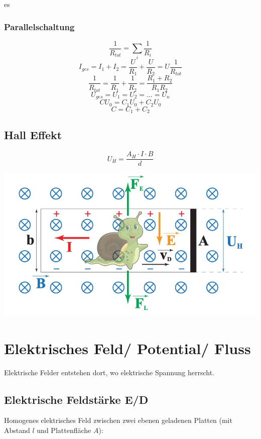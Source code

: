 es\documentclass[a4paper, fontsize=8pt, landscape]{scrartcl}
\begin{document}
\begin{multicols*}{4}
\subsubsection{Parallelschaltung}
\[\frac{1}{R_{tot}} = \sum_i \frac{1}{R_i}\]
\[I_{ges} = I_1 + I_2 = \frac{U}{R_1} + \frac{U}{R_2} = U\frac{1}{R_{tot}}\]
\[\frac{1}{R_{tot}} = \frac{1}{R_1} + \frac{1}{R_2} = \frac{R_1 + R_2}{R_1R_2}\]
\[U_{ges} = U_1 = U_2 = \dots = U_n\]
\[CU_0 = C_1U_0 + C_2U_0\]
\[C = C_1 + C_2\]


\subsection{Hall Effekt}
\[U_H = \frac{A_H \cdot I \cdot B}{d}\]
\begin{center}
    \includegraphics[scale=0.15]{Images/Halleffekt.jpg}
\end{center}

\columnbreak
\section{Elektrisches Feld/ Potential/ Fluss}
Elektrische Felder entstehen dort, wo elektrische Spannung herrscht.

\subsection{Elektrische Feldstärke E/D}
    Homogenes elektrisches Feld zwischen zwei ebenen geladenen Platten (mit Abstand $l$ und Plattenfläche $A$):
    

\end{multicols*}
\end{document}
